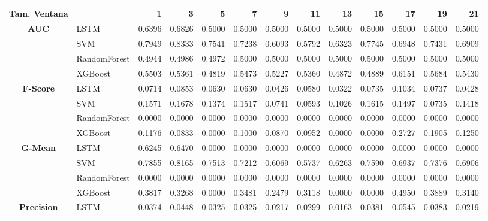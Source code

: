\begin{table}[h]
	\centering
	\begin{adjustbox}{max width=15cm}
		\begin{tabular}{|c|l|r|r|r|r|r|r|r|r|r|r|r|}
			\hline
			\textbf{Tam. Ventana} &         &      1  &      3  &      5  &      7  &      9  &      11 &      13 &      15 &      17 &      19 &      21 \\
			\hline
			\textbf{AUC} & LSTM &  0.6396 &  0.6826 &  0.5000 &  0.5000 &  0.5000 &  0.5000 &  0.5000 &  0.5000 &  0.5000 &  0.5000 &  0.5000 \\
			& SVM &  0.7949 &  0.8333 &  0.7541 &  0.7238 &  0.6093 &  0.5792 &  0.6323 &  0.7745 &  0.6948 &  0.7431 &  0.6909 \\
			& RandomForest &  0.4944 &  0.4986 &  0.4972 &  0.5000 &  0.5000 &  0.5000 &  0.5000 &  0.5000 &  0.5000 &  0.5000 &  0.5000 \\
			& XGBoost &  0.5503 &  0.5361 &  0.4819 &  0.5473 &  0.5227 &  0.5360 &  0.4872 &  0.4889 &  0.6151 &  0.5684 &  0.5430 \\
			\hline
			\textbf{F-Score} & LSTM &  0.0714 &  0.0853 &  0.0630 &  0.0630 &  0.0426 &  0.0580 &  0.0322 &  0.0735 &  0.1034 &  0.0737 &  0.0428 \\
			& SVM &  0.1571 &  0.1678 &  0.1374 &  0.1517 &  0.0741 &  0.0593 &  0.1026 &  0.1615 &  0.1497 &  0.0735 &  0.1418 \\
			& RandomForest &  0.0000 &  0.0000 &  0.0000 &  0.0000 &  0.0000 &  0.0000 &  0.0000 &  0.0000 &  0.0000 &  0.0000 &  0.0000 \\
			& XGBoost &  0.1176 &  0.0833 &  0.0000 &  0.1000 &  0.0870 &  0.0952 &  0.0000 &  0.0000 &  0.2727 &  0.1905 &  0.1250 \\
			\hline
			\textbf{G-Mean} & LSTM &  0.6245 &  0.6470 &  0.0000 &  0.0000 &  0.0000 &  0.0000 &  0.0000 &  0.0000 &  0.0000 &  0.0000 &  0.0000 \\
			& SVM &  0.7855 &  0.8165 &  0.7513 &  0.7212 &  0.6069 &  0.5737 &  0.6263 &  0.7590 &  0.6937 &  0.7376 &  0.6906 \\
			& RandomForest &  0.0000 &  0.0000 &  0.0000 &  0.0000 &  0.0000 &  0.0000 &  0.0000 &  0.0000 &  0.0000 &  0.0000 &  0.0000 \\
			& XGBoost &  0.3817 &  0.3268 &  0.0000 &  0.3481 &  0.2479 &  0.3118 &  0.0000 &  0.0000 &  0.4950 &  0.3889 &  0.3140 \\
			\hline
			\textbf{Precision} & LSTM &  0.0374 &  0.0448 &  0.0325 &  0.0325 &  0.0217 &  0.0299 &  0.0163 &  0.0381 &  0.0545 &  0.0383 &  0.0219 \\

\end{tabular}
\end{adjustbox}
\end{table}
